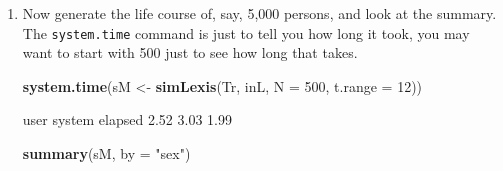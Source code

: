 \documentclass[
]{book}
\newenvironment{Shaded}{\begin{snugshade}}{\end{snugshade}}
\newcommand{\AttributeTok}[1]{\textcolor[rgb]{0.13,0.29,0.53}{#1}}
\newcommand{\DecValTok}[1]{\textcolor[rgb]{0.00,0.00,0.81}{#1}}
\newcommand{\FunctionTok}[1]{\textcolor[rgb]{0.13,0.29,0.53}{\textbf{#1}}}
\newcommand{\NormalTok}[1]{#1}
\newcommand{\OtherTok}[1]{\textcolor[rgb]{0.56,0.35,0.01}{#1}}
\newcommand{\StringTok}[1]{\textcolor[rgb]{0.31,0.60,0.02}{#1}}
\begin{document}
\begin{enumerate}
\begin{Shaded}
\begin{Highlighting}[]
\FunctionTok{summary}\NormalTok{(iL, }\AttributeTok{by =} \StringTok{"sex"}\NormalTok{)}
\end{Highlighting}
\end{Shaded}

\begin{Shaded}
\begin{Highlighting}[]
\NormalTok{$M}

\NormalTok{Transitions:}
\NormalTok{     To}
\NormalTok{From  NRA Rem ESRD ESRD(Rem) Records: Events: Risk time: Persons:}
\NormalTok{  NRA   0   0   10         0       10      10       60.8       10}

\NormalTok{$F}

\NormalTok{Transitions:}
\NormalTok{     To}
\NormalTok{From  NRA Rem ESRD ESRD(Rem) Records: Events: Risk time: Persons:}
\NormalTok{  NRA   0   1    9         0       10      10      78.05       10}
\NormalTok{  Rem   0   0    0         1        1       1       4.37        1}
\NormalTok{  Sum   0   1    9         1       11      11      82.42       10}
\end{Highlighting}
\end{Shaded}

  What type of object have you got as \texttt{iL}?
\item
  Now generate the life course of, say, 5,000 persons, and look at the summary.
  The \texttt{system.time} command is just to tell you how long it
  took, you may want to start with 500 just to see how long that takes.

\begin{Shaded}
\begin{Highlighting}[]
\FunctionTok{system.time}\NormalTok{(sM }\OtherTok{\textless{}{-}} \FunctionTok{simLexis}\NormalTok{(Tr, inL, }\AttributeTok{N =} \DecValTok{500}\NormalTok{, }\AttributeTok{t.range =} \DecValTok{12}\NormalTok{))}
\end{Highlighting}
\end{Shaded}

\begin{Shaded}
\begin{Highlighting}[]
\NormalTok{   user  system elapsed }
\NormalTok{   2.52    3.03    1.99 }
\end{Highlighting}
\end{Shaded}

\begin{Shaded}
\begin{Highlighting}[]
\FunctionTok{summary}\NormalTok{(sM, }\AttributeTok{by =} \StringTok{"sex"}\NormalTok{)}
\end{Highlighting}
\end{Shaded}


\end{enumerate}
\end{document}
